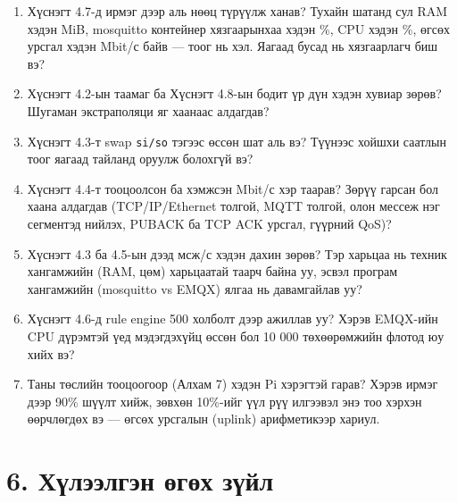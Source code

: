 \begin{enumerate}
\def\labelenumi{\arabic{enumi}.}
\item
  Хүснэгт 4.7-д ирмэг дээр аль нөөц түрүүлж ханав? Тухайн шатанд сул RAM хэдэн MiB, mosquitto контейнер хязгаарынхаа хэдэн \%, CPU хэдэн \%, өгсөх урсгал хэдэн Mbit/с байв --- тоог нь хэл. Яагаад бусад нь хязгаарлагч биш вэ?
\item
  Хүснэгт 4.2-ын таамаг ба Хүснэгт 4.8-ын бодит үр дүн хэдэн хувиар зөрөв? Шугаман экстраполяци яг хаанаас алдагдав?
\item
  Хүснэгт 4.3-т swap \texttt{si/so} тэгээс өссөн шат аль вэ? Түүнээс хойшхи саатлын тоог яагаад тайланд оруулж болохгүй вэ?
\item
  Хүснэгт 4.4-т тооцоолсон ба хэмжсэн Mbit/с хэр таарав? Зөрүү гарсан бол хаана алдагдав (TCP/IP/Ethernet толгой, MQTT толгой, олон мессеж нэг сегментэд нийлэх, PUBACK ба TCP ACK урсгал, гүүрний QoS)?
\item
  Хүснэгт 4.3 ба 4.5-ын дээд мсж/с хэдэн дахин зөрөв? Тэр харьцаа нь техник хангамжийн (RAM, цөм) харьцаатай таарч байна уу, эсвэл програм хангамжийн (mosquitto vs EMQX) ялгаа нь давамгайлав уу?
\item
  Хүснэгт 4.6-д rule engine 500 холболт дээр ажиллав уу? Хэрэв EMQX-ийн CPU дүрэмтэй үед мэдэгдэхүйц өссөн бол 10 000 төхөөрөмжийн флотод юу хийх вэ?
\item
  Таны төслийн тооцоогоор (Алхам 7) хэдэн Pi хэрэгтэй гарав? Хэрэв ирмэг дээр 90\% шүүлт хийж, зөвхөн 10\%-ийг үүл рүү илгээвэл энэ тоо хэрхэн өөрчлөгдөх вэ --- өгсөх урсгалын (uplink) арифметикээр хариул.
\end{enumerate}

\hypertarget{ux445ux4afux43bux44dux44dux43bux433ux44dux43d-ux4e9ux433ux4e9ux445-ux437ux4afux439ux43b}{%
\section{6. Хүлээлгэн өгөх зүйл}\label{ux445ux4afux43bux44dux44dux43bux433ux44dux43d-ux4e9ux433ux4e9ux445-ux437ux4afux439ux43b}}


